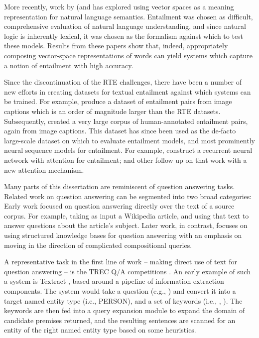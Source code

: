 More recently, work by 
  (and  has explored using vector spaces
  as a meaning representation for natural language semantics.
Entailment was chosen as difficult, comprehensive evaluation of natural language
  understanding, and since natural logic is inherently lexical, it was chosen
  as the formalism against which to test these models.
Results from these papers show that, indeed, appropriately composing
  vector-space representations of words can yield systems which capture a
  notion of entailment with high accuracy.

Since the discontinuation of the RTE challenges, there have been a number of
  new efforts in creating datasets for textual entailment against which
  systems can be trained.
For example,  produce a dataset of entailment
  pairs from image captions which is an order of magnitude larger than the RTE
  datasets.
Subsequently,  created a very large corpus
  of human-annotated entailment pairs, again from image captions.
This dataset has since been used as the de-facto large-scale dataset on which
  to evaluate entailment models, and most prominently neural sequence models for
  entailment.
For example,  construct a recurrent neural network
  with attention for entailment;  and other
  follow up on that work with a new attention mechanism.



%
%
Many parts of this dissertation are reminiscent of question answering tasks.
Related work on question answering can be segmented into two broad categories:
Early work focused on question answering directly over the text of a
  source corpus.
For example, taking as input a Wikipedia article, and using that text to answer
  questions about the article's subject.
Later work, in contrast, focuses on using structured knowledge bases for question
  answering with an emphasis on moving in the direction of 
  complicated compositional queries.

A representative task in the first line of work -- making direct use of text
  for question answering -- is the TREC Q/A competitions 
  \cite{key:2001voorhees-trec,key:2006voorhees-trec,key:2007dang-trec,key:2008voorhees-trec}.
An early example of such a system is Textract \cite{key:1999srihari-trec}, based around 
  a pipeline of information extraction components.
The system would take a question (e.g., )
  and convert it into a target named entity type (i.e., PERSON), and a set of keywords
  (i.e., , ).
The keywords are then fed into a query expansion module to expand the domain of candidate
  premises returned, and the resulting sentences are scanned for an entity of the right
  named entity type based on some heuristics.

